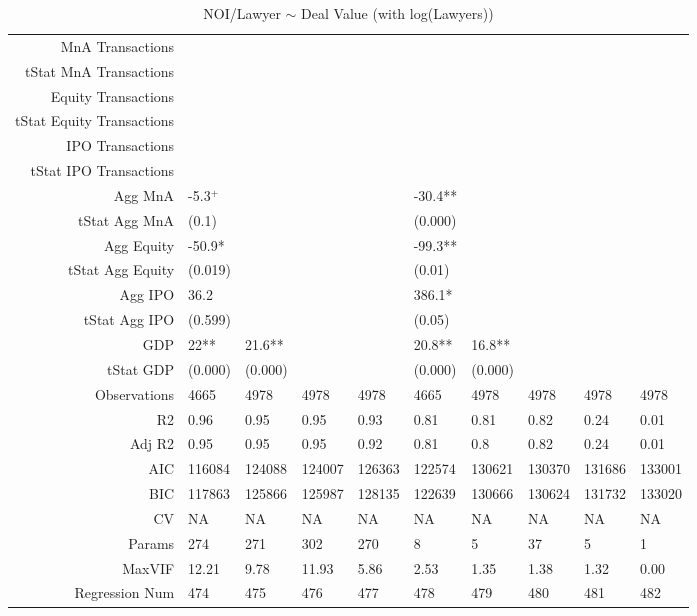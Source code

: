 \begin{table}[ht]
\begin{tabular}{rlllllllll}
  MnA Transactions &  &  &  &  &  &  &  &  &  \\ 
  tStat MnA Transactions &  &  &  &  &  &  &  &  &  \\ 
  Equity Transactions &  &  &  &  &  &  &  &  &  \\ 
  tStat Equity Transactions &  &  &  &  &  &  &  &  &  \\ 
  IPO Transactions &  &  &  &  &  &  &  &  &  \\ 
  tStat IPO Transactions &  &  &  &  &  &  &  &  &  \\ 
  Agg MnA & -5.3$^{+}$ &  &  &  & -30.4** &  &  &  &  \\ 
  tStat Agg MnA & (0.1) &  &  &  & (0.000) &  &  &  &  \\ 
  Agg Equity & -50.9* &  &  &  & -99.3** &  &  &  &  \\ 
  tStat Agg Equity & (0.019) &  &  &  & (0.01) &  &  &  &  \\ 
  Agg IPO & 36.2 &  &  &  & 386.1* &  &  &  &  \\ 
  tStat Agg IPO & (0.599) &  &  &  & (0.05) &  &  &  &  \\ 
  GDP & 22** & 21.6** &  &  & 20.8** & 16.8** &  &  &  \\ 
  tStat GDP & (0.000) & (0.000) &  &  & (0.000) & (0.000) &  &  &  \\ 
  Observations & 4665 & 4978 & 4978 & 4978 & 4665 & 4978 & 4978 & 4978 & 4978 \\ 
  R2 & 0.96 & 0.95 & 0.95 & 0.93 & 0.81 & 0.81 & 0.82 & 0.24 & 0.01 \\ 
  Adj R2 & 0.95 & 0.95 & 0.95 & 0.92 & 0.81 & 0.8 & 0.82 & 0.24 & 0.01 \\ 
  AIC & 116084 & 124088 & 124007 & 126363 & 122574 & 130621 & 130370 & 131686 & 133001 \\ 
  BIC & 117863 & 125866 & 125987 & 128135 & 122639 & 130666 & 130624 & 131732 & 133020 \\ 
  CV & NA & NA & NA & NA & NA & NA & NA & NA & NA \\ 
  Params & 274 & 271 & 302 & 270 & 8 & 5 & 37 & 5 & 1 \\ 
  MaxVIF & 12.21 & 9.78 & 11.93 & 5.86 & 2.53 & 1.35 & 1.38 & 1.32 & 0.00 \\ 
  Regression Num & 474 & 475 & 476 & 477 & 478 & 479 & 480 & 481 & 482 \\ 
   \hline
\end{tabular}
\caption{NOI/Lawyer $\sim$ Deal Value (with log(Lawyers))} 
\end{table}
